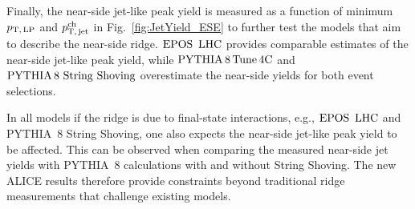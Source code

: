 Finally, the near-side jet-like peak yield is measured as a function of minimum $p_\mathrm{T,\,LP}$ and $p_\mathrm{T,\,jet}^\mathrm{ch}$ in Fig.~\ref{fig:JetYield_ESE} to further test the models that aim to describe the near-side ridge. ${\mathrm{EPOS}\,~\mathrm{LHC}}$ provides comparable estimates of the near-side jet-like peak yield, while $\mathrm{PYTHIA}\,8\,\mathrm{Tune\,4C}$ and ${\mathrm{PYTHIA}\,8~\mathrm{String}~}\mathrm{Shoving}$ overestimate the near-side yields for both event selections.

In all models if the ridge is due to final-state interactions, e.g., ${\mathrm{EPOS}\,~\mathrm{LHC}}$ and PYTHIA~8 String Shoving, one also expects the near-side jet-like peak yield to be affected. This can be observed when comparing the measured near-side jet yields with PYTHIA~8 calculations with and without String Shoving. The new ALICE results therefore provide constraints beyond traditional ridge measurements that challenge existing models.

